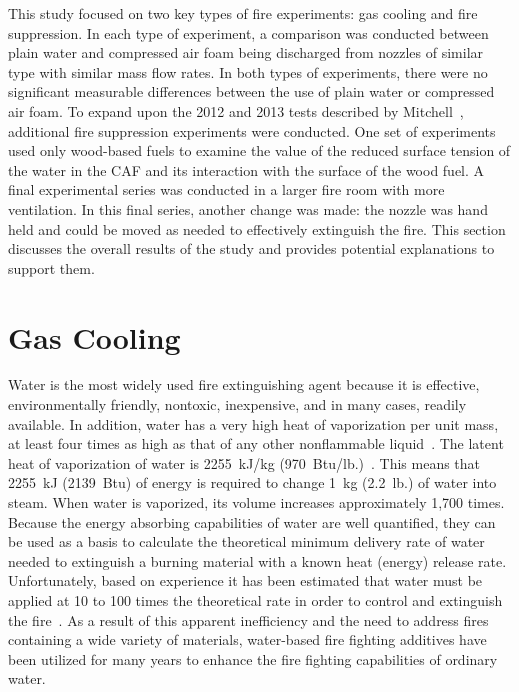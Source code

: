 \documentclass[12pt,oneside]{book}
\begin{document}
This study focused on two key types of fire experiments: gas cooling and fire suppression. In each type of experiment, a comparison was conducted between plain water and compressed air foam being discharged from nozzles of similar type with similar mass flow rates. In both types of experiments, there were no significant measurable differences between the use of plain water or compressed air foam. To expand upon the 2012 and 2013 tests described by Mitchell~\cite{Mitchell:1}, additional fire suppression experiments were conducted. One set of experiments used only wood-based fuels to examine the value of the reduced surface tension of the water in the CAF and its interaction with the surface of the wood fuel. A final experimental series was conducted in a larger fire room with more ventilation. In this final series, another change was made: the nozzle was hand held and could be moved as needed to effectively extinguish the fire. This section discusses the overall results of the study and provides potential explanations to support them.

\section{Gas Cooling}
\label{sec:Gas_Cooling_discuss}
 
Water is the most widely used fire extinguishing agent because it is effective, environmentally friendly, nontoxic, inexpensive, and in many cases, readily available. In addition, water has a very high heat of vaporization per unit mass, at least four times as high as that of any other nonflammable liquid~\cite{NFPA}. The latent heat of vaporization of water is 2255~kJ/kg (970~Btu/lb.)~\cite{NFPA}. This means that 2255~kJ (2139~Btu) of energy is required to change 1~kg (2.2~lb.) of water into steam. When water is vaporized, its volume increases approximately 1,700 times. Because the energy absorbing capabilities of water are well quantified, they can be used as a basis to calculate the theoretical minimum delivery rate of water needed to extinguish a burning material with a known heat (energy) release rate. Unfortunately, based on experience it has been estimated that water must be applied at 10 to 100 times the theoretical rate in order to control and extinguish the fire~\cite{Friedman:2}. As a result of this apparent inefficiency and the need to address fires containing a wide variety of materials, water-based fire fighting additives have been utilized for many years to enhance the fire fighting capabilities of ordinary water.
\end{document}
